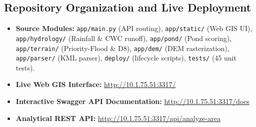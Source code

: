 \documentclass[manuscript,screen,review]{acmart}
\begin{document}
\subsection{Repository Organization and Live Deployment}
\begin{itemize}
    \item \textbf{Source Modules:} \texttt{app/main.py} (API routing), \texttt{app/static/} (Web GIS UI), \texttt{app/hydrology/} (Rainfall \& CWC runoff), \texttt{app/pond/} (Pond scoring), \texttt{app/terrain/} (Priority-Flood \& D8), \texttt{app/dem/} (DEM rasterization), \texttt{app/parser/} (KML parser), \texttt{deploy/} (lifecycle scripts), \texttt{tests/} (45 unit tests).
    \item \textbf{Live Web GIS Interface:} \url{http://10.1.75.51:3317/}
    \item \textbf{Interactive Swagger API Documentation:} \url{http://10.1.75.51:3317/docs}
    \item \textbf{Analytical REST API:} \url{http://10.1.75.51:3317/api/analyze-area}
\end{itemize}
\end{document}
